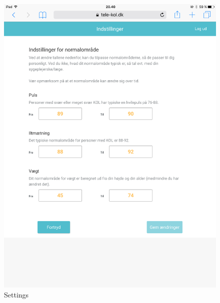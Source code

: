 \begin{figure}[h]
  \centering
  \begin{minipage}[b]{0.45\textwidth}
    \includegraphics[width=\textwidth]{images/implementation/settingsImp.png}
    \caption{Settings}
    \label{fig:settings}
  \end{minipage}
  \hfill
  \begin{minipage}[b]{0.45\textwidth}

\end{minipage}
\end{figure}
